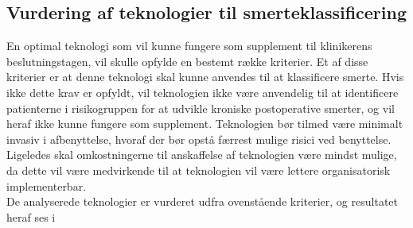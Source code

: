 \subsection{Vurdering af teknologier til smerteklassificering}
En optimal teknologi som vil kunne fungere som supplement til klinikerens beslutningstagen, vil skulle opfylde en bestemt række kriterier. Et af disse kriterier er at denne teknologi skal kunne anvendes til at klassificere smerte. Hvis ikke dette krav er opfyldt, vil teknologien ikke være anvendelig til at identificere patienterne i risikogruppen for at udvikle kroniske postoperative smerter, og vil heraf ikke kunne fungere som supplement. Teknologien bør tilmed være minimalt invasiv i afbenyttelse, hvoraf der bør opstå færrest mulige risici ved benyttelse. Ligeledes skal omkostningerne til anskaffelse af teknologien være mindst mulige, da dette vil være medvirkende til at teknologien vil være lettere organisatorisk implementerbar. \\
De analyserede teknologier er vurderet udfra ovenstående kriterier, og resultatet heraf ses i   


